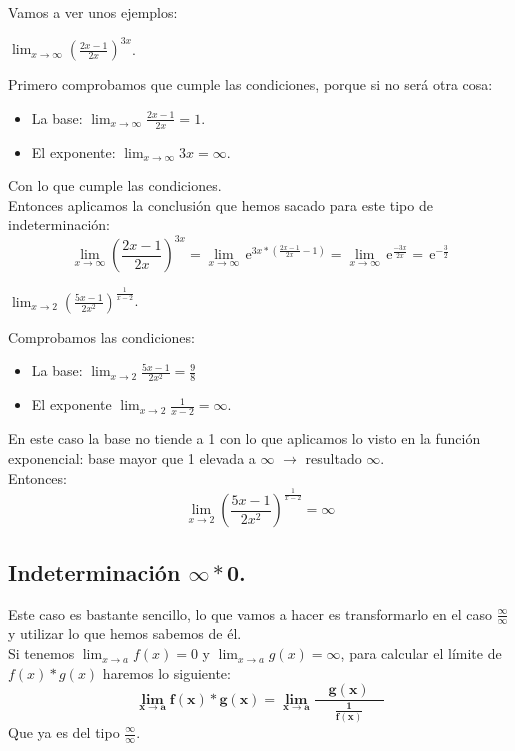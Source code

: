 \documentclass[a4paper,11pt,answers]{exam}
\newcommand\ddfrac[2]{\frac{\displaystyle #1}{\displaystyle #2}}
\newcommand{\e}{\,\mathrm{e}}
\begin{document}
Vamos a ver unos ejemplos:
\begin{questions}
\question $\lim_{x \to \infty}\left(\frac{2x - 1}{2x}\right)^{3x}$.
\begin{solution}
Primero comprobamos que cumple las condiciones, porque si no será otra cosa:
\begin{itemize}
	\item La base: $\lim_{x \to \infty} \frac{2x - 1}{2x} = 1$.
	\item El exponente: $\lim_{x \to \infty} 3x = \infty$.
\end{itemize}
Con lo que cumple las condiciones.\\

Entonces aplicamos la conclusión que hemos sacado para este tipo de indeterminación:
\[\lim_{x \to \infty}\left(\frac{2x - 1}{2x}\right)^{3x} = \lim_{x \to \infty} \e^{3x*\left(\frac{2x - 1}{2x}-1 \right)} =
\lim_{x \to \infty} \e^\frac{-3x}{2x} = \e^{-\frac{3}{2}}\]
\end{solution}

\question $\lim_{x \to 2} \left(\frac{5x - 1}{2x^2}\right)^\frac{1}{x-2}$.
\begin{solution}
Comprobamos las condiciones:
\begin{itemize}
	\item La base: $\lim_{x \to 2} \frac{5x - 1}{2x^2} =\frac{9}{8}$
	\item El exponente $\lim_{x \to 2} \frac{1}{x-2} = \infty$.
\end{itemize}
En este caso la base no tiende a 1 con lo que aplicamos lo visto en la función exponencial: base mayor que 1 elevada a $\infty$ $\to$ resultado $\infty$.\\
Entonces:
\[\lim_{x \to 2} \left(\frac{5x - 1}{2x^2}\right)^\frac{1}{x-2} = \infty\]
\end{solution}
\end{questions}

\subsection{Indeterminación $\boldsymbol{\infty * 0}$.}
Este caso es bastante sencillo, lo que vamos a hacer es transformarlo en el caso $\frac{\infty}{\infty}$ y utilizar lo que hemos sabemos de él.\\

Si tenemos $\lim_{x \to a} f(x) = 0$ y $\lim_{x \to a} g(x) = \infty$, para calcular el límite de $f(x)*g(x)$ haremos lo siguiente:
\[\boldsymbol{\lim_{x \to a} f(x)*g(x) = \lim_{x \to a} \ddfrac{\quad g(x)\quad }{\frac{1}{f(x)}}}\]
Que ya es del tipo $\frac{\infty}{\infty}$.\\
\end{document}

